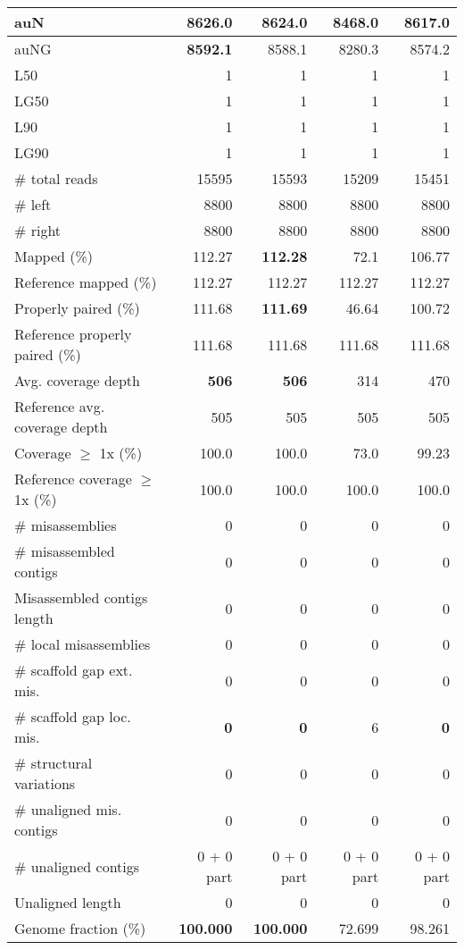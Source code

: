 \documentclass[12pt,a4paper]{article}
\begin{document}
\begin{table}[ht]
\begin{center}
\begin{tabular}{|l*{4}{|r}|}
auN & {\bf 8626.0} & 8624.0 & 8468.0 & 8617.0 \\ \hline
auNG & {\bf 8592.1} & 8588.1 & 8280.3 & 8574.2 \\ \hline
L50 & 1 & 1 & 1 & 1 \\ \hline
LG50 & 1 & 1 & 1 & 1 \\ \hline
L90 & 1 & 1 & 1 & 1 \\ \hline
LG90 & 1 & 1 & 1 & 1 \\ \hline
\# total reads & 15595 & 15593 & 15209 & 15451 \\ \hline
\# left & 8800 & 8800 & 8800 & 8800 \\ \hline
\# right & 8800 & 8800 & 8800 & 8800 \\ \hline
Mapped (\%) & 112.27 & {\bf 112.28} & 72.1 & 106.77 \\ \hline
Reference mapped (\%) & 112.27 & 112.27 & 112.27 & 112.27 \\ \hline
Properly paired (\%) & 111.68 & {\bf 111.69} & 46.64 & 100.72 \\ \hline
Reference properly paired (\%) & 111.68 & 111.68 & 111.68 & 111.68 \\ \hline
Avg. coverage depth & {\bf 506} & {\bf 506} & 314 & 470 \\ \hline
Reference avg. coverage depth & 505 & 505 & 505 & 505 \\ \hline
Coverage $\geq$ 1x (\%) & 100.0 & 100.0 & 73.0 & 99.23 \\ \hline
Reference coverage $\geq$ 1x (\%) & 100.0 & 100.0 & 100.0 & 100.0 \\ \hline
\# misassemblies & 0 & 0 & 0 & 0 \\ \hline
\# misassembled contigs & 0 & 0 & 0 & 0 \\ \hline
Misassembled contigs length & 0 & 0 & 0 & 0 \\ \hline
\# local misassemblies & 0 & 0 & 0 & 0 \\ \hline
\# scaffold gap ext. mis. & 0 & 0 & 0 & 0 \\ \hline
\# scaffold gap loc. mis. & {\bf 0} & {\bf 0} & 6 & {\bf 0} \\ \hline
\# structural variations & 0 & 0 & 0 & 0 \\ \hline
\# unaligned mis. contigs & 0 & 0 & 0 & 0 \\ \hline
\# unaligned contigs & 0 + 0 part & 0 + 0 part & 0 + 0 part & 0 + 0 part \\ \hline
Unaligned length & 0 & 0 & 0 & 0 \\ \hline
Genome fraction (\%) & {\bf 100.000} & {\bf 100.000} & 72.699 & 98.261 \\ \hline

\end{tabular}
\end{center}
\end{table}
\end{document}
